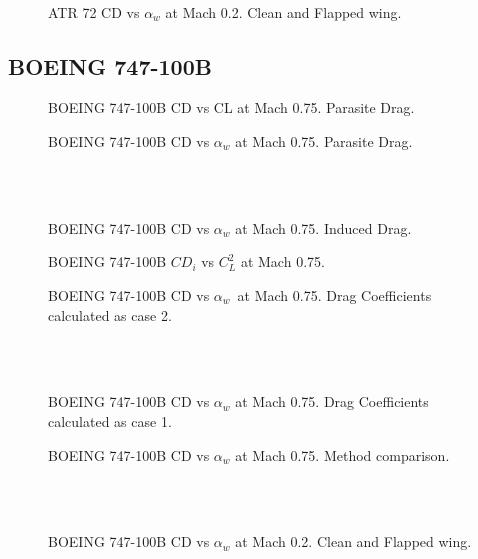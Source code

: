 \noindent \\
\begin{figure}[H]
\centering

\caption{ATR 72 CD vs $\alpha_w$  at Mach 0.2. Clean and Flapped wing.}
\label{fig:DragATR}
\end{figure}



\subsection{BOEING 747-100B}

\begin{figure}[H]
\centering

\caption{BOEING 747-100B CD vs CL at Mach 0.75. Parasite Drag.}
\label{fig:DragATR}
\end{figure}

\begin{figure}[H]
\centering

\caption{BOEING 747-100B CD vs $\alpha_w$ at Mach 0.75. Parasite Drag.}
\label{fig:DragATR}
\end{figure}
\noindent \\\\
\begin{figure}[H]
\centering

\caption{BOEING 747-100B CD vs $\alpha_w$ at Mach 0.75. Induced Drag.}
\label{fig:DragATR}
\end{figure}

\begin{figure}[H]
\centering

\caption{BOEING 747-100B $CD_i$ vs $C_L^2$  at Mach 0.75.}
\label{fig:DragATR}
\end{figure}

\begin{figure}[H]
\centering

\caption{BOEING 747-100B CD vs $\alpha_w$\  at Mach 0.75. Drag Coefficients calculated as case 2.}
\label{fig:DragATR}
\end{figure}
\noindent \\\\
\begin{figure}[H]
\centering

\caption{BOEING 747-100B CD vs $\alpha_w$  at Mach 0.75. Drag Coefficients calculated as case 1.}
\label{fig:DragATR}
\end{figure}

\begin{figure}[H]
\centering

\caption{BOEING 747-100B CD vs $\alpha_w$  at Mach 0.75. Method comparison.}
\label{fig:DragATR}
\end{figure}
\noindent \\\\
\begin{figure}[H]
\centering

\caption{BOEING 747-100B CD vs $\alpha_w$  at Mach 0.2. Clean and Flapped wing.}
\label{fig:DragATR}
\end{figure}

